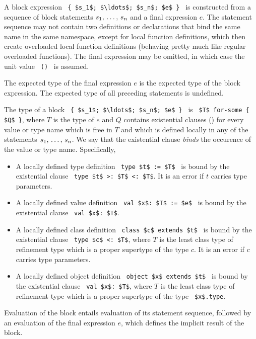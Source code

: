 A block expression ~\lstinline!{ $s_1$; $\ldots$; $s_n$; $e$ }!~ is constructed from a sequence of block statements $s_1 ,\, \ldots ,\, s_n$ and a final expression $e$. The statement sequence may not contain two definitions or declarations that bind the same name in the same namespace, except for local function definitions, which then create overloaded local function definitions (behaving pretty much like regular overloaded functions). The final expression may be omitted, in which case the unit value ~\lstinline!()!~ is assumed. 

The expected type of the final expression $e$ is the expected type of the block expression. The expected type of all preceding statements is undefined. 

The type of a block ~\lstinline!{ $s_1$; $\ldots$; $s_n$; $e$ }!~ is ~\lstinline!$T$ for-some { $Q$ }!, where $T$ is the type of $e$ and $Q$ contains existential clauses () for every value or type name which is free in $T$ and which is defined locally in any of the statements $s_1 ,\, \ldots ,\, s_n$. We say that the existential clause {\em binds} the occurence of the value or type name. Specifically, 
\begin{itemize}

\item A locally defined type definition ~\lstinline!type $t$ := $T$!~ is bound by the existential clause ~\lstinline!type $t$ >: $T$ <: $T$!. It is an error if $t$ carries type parameters. 

\item A locally defined value definition ~\lstinline!val $x$: $T$ := $e$!~ is bound by the existential clause ~\lstinline!val $x$: $T$!. 

\item A locally defined class definition ~\lstinline!class $c$ extends $t$!~ is bound by the existential clause ~\lstinline!type $c$ <: $T$!, where $T$ is the least class type of refinement type which is a proper supertype of the type $c$. It is an error if $c$ carries type parameters. 

\item A locally defined object definition ~\lstinline!object $x$ extends $t$!~ is bound by the existential clause ~\lstinline!val $x$: $T$!, where $T$ is the least class type of refinement type which is a proper supertype of the type ~\lstinline!$x$.type!.
\end{itemize}

Evaluation of the block entails evaluation of its statement sequence, followed by an evaluation of the final expression $e$, which defines the implicit result of the block. 





